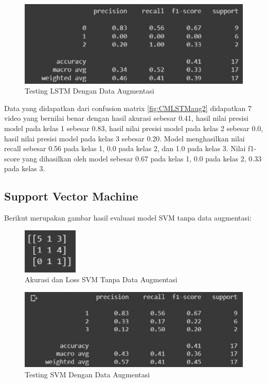 \begin{figure} [H] \centering
  \includegraphics[scale=1]{gambar/scoreLSTMaug2.png}
  \caption{Testing LSTM Dengan Data Augmentasi}
  \label{fig:ScoreLSTMaug2}
\end{figure}
Data yang didapatkan dari confusion matrix \ref{fig:CMLSTMaug2} didapatkan 7 video yang bernilai benar
dengan hasil akurasi sebesar 0.41, hasil nilai presisi model pada kelas 1 sebesar 0.83, hasil nilai
presisi model pada kelas 2 sebesar 0.0, hasil nilai presisi model pada kelas 3 sebesar 0.20. Model menghasilkan
nilai recall sebesar 0.56 pada kelas 1, 0.0 pada kelas 2, dan 1.0 pada kelas 3. Nilai f1-score yang dihasilkan
oleh model sebesar 0.67 pada kelas 1, 0.0 pada kelas 2, 0.33 pada kelas 3.

\subsection{Support Vector Machine}
Berikut merupakan gambar hasil evaluasi model SVM tanpa data augmentasi:

\newpage
\begin{figure} [H] \centering
  \includegraphics[scale=5]{gambar/CMSVMnoAug2.png}
  \caption{Akurasi dan Loss SVM Tanpa Data Augmentasi}
  \label{fig:CMSVMnoaug2}
\end{figure}

\begin{figure} [H] \centering
  \includegraphics[scale=1]{gambar/scoreSVMnoaug2.png}
  \caption{Testing SVM Dengan Data Augmentasi}
  \label{fig:ScoreSVMnoaug2}
\end{figure}


